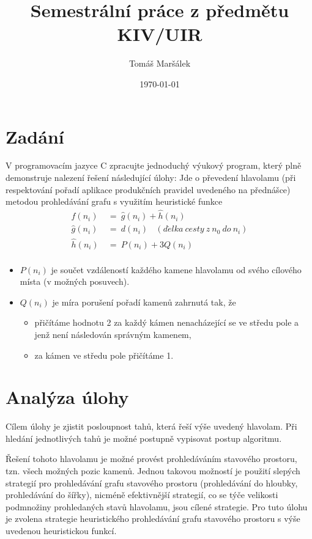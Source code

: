 \documentclass[11pt]{article}
\author{Tomáš Maršálek}
\title{Semestrální práce z předmětu KIV/UIR}
\date{\today}
\begin{document}
\begin{titlepage}
\maketitle
\end{titlepage}

\section{Zadání}
V programovacím jazyce C zpracujte jednoduchý výukový program, který plně
demonstruje nalezení řešení následující úlohy: Jde o převedení hlavolamu 
(při respektování pořadí aplikace produkčních pravidel uvedeného na přednášce)
metodou prohledávání grafu s využitím heuristické funkce
\begin{align*}
\hat{f}(n_i)~&=~\hat{g}(n_i) + \hat{h}(n_i) \\
\hat{g}(n_i)~&=~d(n_i)~~~~(d\acute{e}lka~cesty~z~n_0~do~n_i) \\
\hat{h}(n_i)~&=~P(n_i) + 3 Q(n_i) \\
\end{align*}

\begin{itemize}
	\item $P(n_i)$ je součet vzdáleností každého kamene hlavolamu od svého
          cílového místa (v možných posuvech).
	\item $Q(n_i)$ je míra porušení pořadí kamenů zahrnutá tak, že
	\begin{itemize}
		\item přičítáme hodnotu 2 za každý kámen nenacházející se ve středu
              pole a jenž není následován správným kamenem,
		\item za kámen ve středu pole přičítáme 1.
	\end{itemize}
\end{itemize}


\section{Analýza úlohy}
Cílem úlohy je zjistit posloupnost tahů, která řeší výše uvedený hlavolam.  Při
hledání jednotlivých tahů je možné postupně vypisovat postup algoritmu.

Řešení tohoto hlavolamu je možné provést prohledáváním stavového prostoru, tzn.
všech možných pozic kamenů. Jednou takovou možností je použití slepých
strategií pro prohledávání grafu stavového prostoru (prohledávání do hloubky,
prohledávání do šířky), nicméně efektivnější strategií, co se týče velikosti
podmnožiny prohledaných stavů hlavolamu, jsou cílené strategie. Pro tuto úlohu
je zvolena strategie heuristického prohledávání grafu stavového prostoru s výše
uvedenou heuristickou funkcí.
\end{document}

